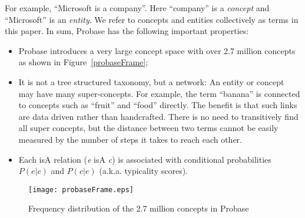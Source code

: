 For example,
``Microsoft is a company''. Here ``company'' is a {\em concept} and
``Microsoft'' is an {\em
  entity}. %
We refer to concepts and entities collectively as terms in this
paper. %
In sum, Probase has the following important properties:
\begin{itemize}
\item Probase introduces a very large concept space with over 2.7
  million concepts as shown in Figure~\ref{probaseFrame};
\item It is not a tree structured taxonomy, but a network: An entity
  or concept may have many super-concepts.
For example, the term ``banana'' is connected to concepts
such as ``fruit'' and ``food'' directly.
  The benefit is that such links are data driven rather than
  handcrafted.
  There is no need to transitively find all super
  concepts, but the distance between two terms cannot be easily
  measured by the number of steps it takes to reach each other.
\item Each isA relation (\emph{e} isA \emph{c}) is associated with conditional
  probabilities $P(e|c)$ and $P(c|e)$ (a.k.a.  typicality scores).
\end{itemize}
\begin{figure*}[t]\label{probaseFrame}
 \centerline{
 \texttt{[image: probaseFrame.eps]}}
 \caption{Frequency distribution of the 2.7 million concepts in Probase} \label{fig:probase}
\end{figure*}

